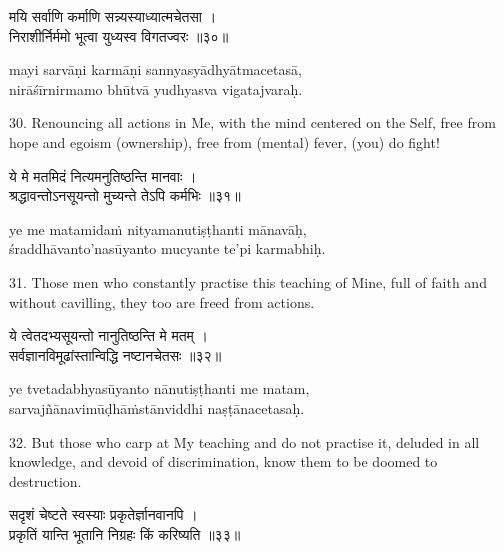 \begin{gitaverse}
मयि सर्वाणि कर्माणि सन्न्यस्याध्यात्मचेतसा । \\
निराशीर्निर्ममो भूत्वा युध्यस्व विगतज्वरः ॥३०॥
\end{gitaverse}

\begin{transliteration}
mayi sarvāṇi karmāṇi sannyasyādhyātmacetasā, \\
nirāśīrnirmamo bhūtvā yudhyasva vigatajvaraḥ.
\end{transliteration}

30. Renouncing all actions in Me, with the mind centered on the Self, free from
hope and egoism (ownership), free from (mental) fever, (you) do fight!

\begin{gitaverse}
ये मे मतमिदं नित्यमनुतिष्ठन्ति मानवाः । \\
श्रद्धावन्तोऽनसूयन्तो मुच्यन्ते तेऽपि कर्मभिः ॥३१॥
\end{gitaverse}

\begin{transliteration}
ye me matamidaṁ nityamanutiṣṭhanti mānavāḥ, \\
śraddhāvanto'nasūyanto mucyante te'pi karmabhiḥ.
\end{transliteration}

31. Those men who constantly practise this teaching of Mine, full of faith and
without cavilling, they too are freed from actions.

\begin{gitaverse}
ये त्वेतदभ्यसूयन्तो नानुतिष्ठन्ति मे मतम् । \\
सर्वज्ञानविमूढांस्तान्विद्धि नष्टानचेतसः ॥३२॥
\end{gitaverse}

\begin{transliteration}
ye tvetadabhyasūyanto nānutiṣṭhanti me matam, \\
sarvajñānavimūḍhāṁstānviddhi naṣṭānacetasaḥ.
\end{transliteration}

32. But those who carp at My teaching and do not practise it, deluded in all
knowledge, and devoid of discrimination, know them to be doomed to destruction.

\begin{gitaverse}
सदृशं चेष्टते स्वस्याः प्रकृतेर्ज्ञानवानपि । \\
प्रकृतिं यान्ति भूतानि निग्रहः किं करिष्यति ॥३३॥
\end{gitaverse}

